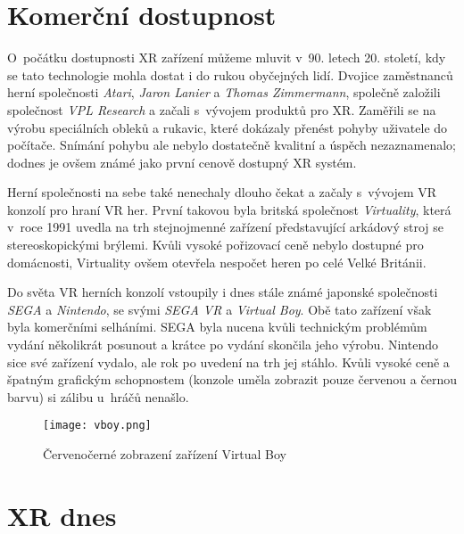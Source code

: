 \section{Komerční dostupnost}

O~počátku dostupnosti XR zařízení můžeme mluvit v~90. letech 20. století, kdy se tato technologie mohla dostat i do rukou obyčejných lidí. Dvojice zaměstnanců herní společnosti \textit{Atari}, \textit{Jaron Lanier} a \textit{Thomas Zimmermann}, společně založili společnost \textit{VPL Research} a začali s~vývojem produktů pro XR. Zaměřili se na výrobu speciálních obleků a rukavic, které dokázaly přenést pohyby uživatele do počítače. Snímání pohybu ale nebylo dostatečně kvalitní a úspěch nezaznamenalo; dodnes je ovšem známé jako první cenově dostupný XR systém. \cite{otechnice_2}

Herní společnosti na sebe také nenechaly dlouho čekat a začaly s~vývojem VR konzolí pro hraní VR her. První takovou byla britská společnost \textit{Virtuality}, která v~roce 1991 uvedla na trh stejnojmenné zařízení představující arkádový stroj se stereoskopickými brýlemi. Kvůli vysoké pořizovací ceně nebylo dostupné pro domácnosti, Virtuality ovšem otevřela nespočet heren po celé Velké Británii. \cite{otechnice_2} \cite{independent_virtuality}

Do světa VR herních konzolí vstoupily i dnes stále známé japonské společnosti \textit{SEGA} a \textit{Nintendo}, se svými \textit{SEGA VR} a \textit{Virtual Boy}. Obě tato zařízení však byla komerčními selháními. SEGA byla nucena kvůli technickým problémům vydání několikrát posunout a krátce po vydání skončila jeho výrobu. Nintendo sice své zařízení vydalo, ale rok po uvedení na trh jej stáhlo. Kvůli vysoké ceně a špatným grafickým schopnostem (konzole uměla zobrazit pouze červenou a černou barvu) si zálibu u~hráčů nenašlo.\cite{otechnice_2}

\begin{figure}[H]
    \centering
    \texttt{[image: vboy.png]}
    \caption{Červeno\textendash černé zobrazení zařízení Virtual Boy \cite{vboy}}
    \label{vboy_red_display}
\end{figure}

\section{XR dnes}

